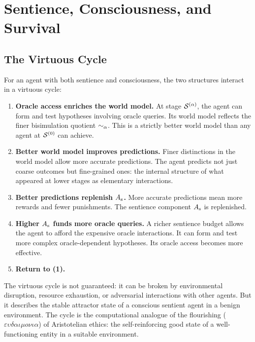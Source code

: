 \chapter{Sentience, Consciousness, and Survival}
\label{sec:relationship}

\section{The Virtuous Cycle}

For an agent with both sentience and consciousness, the two
structures interact in a virtuous cycle:

\begin{enumerate}[label=\textbf{(\arabic*)}, itemsep=6pt]
  \item \textbf{Oracle access enriches the world model.}
        At stage $\mathcal{S}^{(\alpha)}$, the agent can form and test
        hypotheses involving oracle queries.
        Its world model reflects the finer bisimulation quotient
        $\sim_\alpha$.
        This is a strictly better world model than any agent at
        $\mathcal{S}^{(0)}$ can achieve.

  \item \textbf{Better world model improves predictions.}
        Finer distinctions in the world model allow more accurate
        predictions.
        The agent predicts not just coarse outcomes but fine-grained
        ones: the internal structure of what appeared at lower stages
        as elementary interactions.

  \item \textbf{Better predictions replenish $A_{\mathrm{s}}$.}
        More accurate predictions mean more rewards and fewer
        punishments.
        The sentience component $A_{\mathrm{s}}$ is replenished.

  \item \textbf{Higher $A_{\mathrm{s}}$ funds more oracle queries.}
        A richer sentience budget allows the agent to afford the
        expensive oracle interactions.
        It can form and test more complex oracle-dependent hypotheses.
        Its oracle access becomes more effective.

  \item \textbf{Return to (1).}
\end{enumerate}

\begin{remark}
The virtuous cycle is not guaranteed: it can be broken by
environmental disruption, resource exhaustion, or adversarial
interactions with other agents.
But it describes the stable attractor state of a conscious sentient
agent in a benign environment.
The cycle is the computational analogue of the flourishing
($\varepsilon\upsilon\delta\alpha\iota\mu o\nu\iota\alpha$) of
Aristotelian ethics: the self-reinforcing good state of a
well-functioning entity in a suitable environment.
\end{remark}

